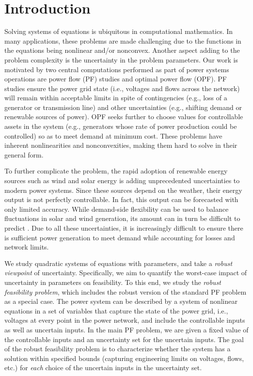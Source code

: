 \section{Introduction} \label{sec:intro}  

Solving systems of equations is ubiquitous in computational mathematics.
In many applications, these problems are made challenging due to the functions in the equations being nonlinear and/or nonconvex.
Another aspect adding to the problem complexity is the uncertainty in the problem parameters.
Our work is motivated by two central computations performed as part of power systems operations are power flow (PF) studies and optimal power flow (OPF).
PF studies ensure the power grid state (i.e., voltages and flows across the network) will remain within acceptable limits in spite of contingencies (e.g., loss of a generator or transmission line) and other uncertainties (e.g., shifting demand or renewable sources of power).
OPF seeks further to choose values for controllable assets in the system (e.g., generators whose rate of power production could be controlled) so as to meet demand at minimum cost.
These problems have inherent nonlinearities and nonconvexities, making them hard to solve in their general form.
  
To further complicate the problem, the rapid adoption of renewable energy sources such as wind and solar energy is adding unprecedented uncertainties to modern power systems.
Since these sources depend on the weather, their energy output is not perfectly controllable.
In fact, this output can be forecasted with only limited accuracy.
While demand-side flexibility can be used to balance fluctuations in solar and wind generation, its amount can in turn be difficult to predict \cite{mathieu2011examining,taylor2015uncertainty}.
Due to all these uncertainties, it is increasingly difficult to ensure there is sufficient power generation to meet demand while accounting for losses and network limits.

\medskip
We study quadratic systems of equations with parameters, and take a \emph{robust viewpoint} of uncertainty.
Specifically, we aim to quantify the worst-case impact of uncertainty in parameters on feasibility.
To this end, we study the \emph{robust feasibility problem}, which includes the robust version of the standard PF problem as a special case.
The power system can be described by a system of nonlinear equations in a set of variables that capture the state of the power grid, i.e., voltages at every point in the power network, and include the controllable inputs as well as uncertain inputs.
In the main PF problem, we are given a fixed value of the controllable inputs and an uncertainty set for the uncertain inputs.
The goal of the robust feasibility problem is to characterize whether the system has a solution within specified bounds (capturing engineering limits on voltages, flows, etc.) for {\em each} choice of the uncertain inputs in the uncertainty set.

